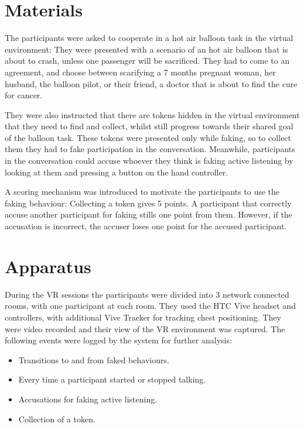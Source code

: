 \documentclass[]{simple-thesis}
\begin{document}
\section{Materials}

The participants were asked to cooperate in a hot air balloon task \citep{Howes2012} in the virtual environment:
They were presented with a scenario of an hot air balloon that is about to crash, unless one passenger will be sacrificed.
They had to come to an agreement, and choose between scarifying a 7 months pregnant woman, her husband, the balloon pilot, or their friend, a doctor that is about to find the cure for cancer.

They were also instructed that there are tokens hidden in the virtual environment that they need to find and collect, whilst still progress towards their shared goal of the balloon task.
These tokens were presented only while faking, so to collect them they had to fake participation in the conversation.
Meanwhile, participants in the conversation could accuse whoever they think is faking active listening by looking at them and pressing a button on the hand controller.

A scoring mechanism was introduced to motivate the participants to use the faking behaviour:
Collecting a token gives 5 points.
A participant that correctly accuse another participant for faking stills one point from them.
However, if the accusation is incorrect, the accuser loses one point for the accused participant.

\section{Apparatus}

During the VR sessions the participants were divided into 3 network connected rooms, with one participant at each room.
They used the HTC Vive headset and controllers, with additional Vive Tracker for tracking chest positioning.
They were video recorded and their view of the VR environment was captured.
The following events were logged by the system for further analysis:

\begin{itemize}
  \item Transitions to and from faked behaviours.
  \item Every time a participant started or stopped talking.
  \item Accusations for faking active listening.
  \item Collection of a token.
\end{itemize}
\end{document}

